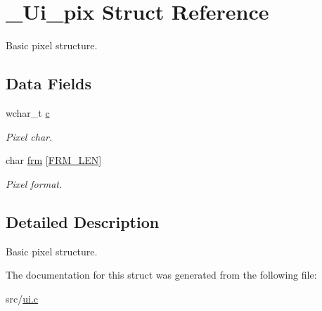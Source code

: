 \hypertarget{struct__Ui__pix}{}\section{\+\_\+\+Ui\+\_\+pix Struct Reference}
\label{struct__Ui__pix}


Basic pixel structure.  


\subsection*{Data Fields}
\begin{DoxyCompactItemize}
\item 
\mbox{\label{struct__Ui__pix_a9ce37ca31ed9e8a3996b0ae4c2c822ee}} 
wchar\+\_\+t \hyperlink{struct__Ui__pix_a9ce37ca31ed9e8a3996b0ae4c2c822ee}{c}
\begin{DoxyCompactList}\small\item\em Pixel char. \end{DoxyCompactList}\item 
\mbox{\label{struct__Ui__pix_a0e503eb95fbe667b3c97e39dbad54649}} 
char \hyperlink{struct__Ui__pix_a0e503eb95fbe667b3c97e39dbad54649}{frm} \mbox{[}\hyperlink{ui_8c_a06eb930d834d042bf22819174e0158a6}{F\+R\+M\+\_\+\+L\+EN}\mbox{]}
\begin{DoxyCompactList}\small\item\em Pixel format. \end{DoxyCompactList}\end{DoxyCompactItemize}


\subsection{Detailed Description}
Basic pixel structure. 

The documentation for this struct was generated from the following file\+:\begin{DoxyCompactItemize}
\item 
src/\hyperlink{ui_8c}{ui.\+c}\end{DoxyCompactItemize}
